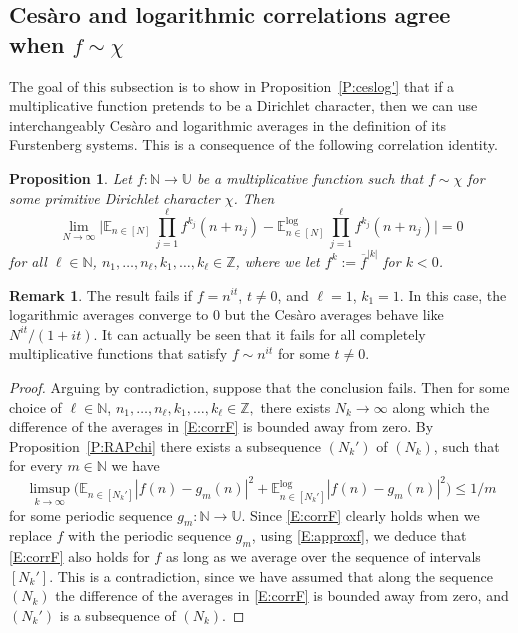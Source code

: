 \documentclass[11pt]{amsart}
\newtheorem{proposition}[lemma]{Proposition}
\theoremstyle{definition}
\newtheorem*{remark}{Remark}
\newcommand{\lE}{\mathbb{E}^{\log}}
\newcommand{\E}{{\mathbb E}}
\newcommand{\N}{{\mathbb N}}
\newcommand{\Z}{{\mathbb Z}}
\newcommand{\U}{{\mathbb U}}
\begin{document}
	\subsection{Ces\`aro and logarithmic correlations agree when $f\sim \chi$}\label{SS:Ces=log}
The goal of this subsection is to show in Proposition~\ref{P:ceslog'} that  if a  multiplicative function  pretends to be a Dirichlet character, then we can use interchangeably Ces\`aro and logarithmic averages in the definition of its Furstenberg systems. This is a consequence of the following correlation identity.
\begin{proposition}\label{P:ceslog}
	Let $f\colon \N\to \U$ be a multiplicative function such that  $f\sim \chi$ for some primitive Dirichlet character $\chi$. Then
	\begin{equation}\label{E:corrF}
		\lim_{N\to\infty}\Big| \E_{n\in [N]}\, \prod_{j=1}^\ell f^{k_j}(n+n_j)-\lE_{n\in [N]}\, \prod_{j=1}^\ell f^{k_j}(n+n_j)\Big|=0
	\end{equation}
	for all $\ell\in \N$, $n_1,\ldots, n_\ell, k_1,\ldots, k_\ell\in \Z$, where we let  $f^k:=\overline{f}^{|k|}$ for $k<0$.
\end{proposition}
\begin{remark}
	The result fails if $f=n^{it}$, $t\neq 0$,  and $\ell=1$, $k_1=1$.  In this case, the logarithmic averages converge to $0$
	but the Ces\`aro averages behave like $N^{it}/(1+it)$.  It can actually be seen that it fails for all completely multiplicative functions that satisfy $f\sim n^{it}$ for some $t\neq 0$.
\end{remark}
\begin{proof}
	Arguing by contradiction, suppose that the conclusion fails. Then for some choice of
	$\ell\in \N$, $n_1,\ldots, n_\ell, k_1,\ldots, k_\ell\in \Z,$ there exists $N_k\to\infty$ along which the difference of the  averages in \eqref{E:corrF} is bounded away from zero. By  Proposition~\ref{P:RAPchi} there exists a subsequence $(N_k')$ of $(N_k)$,  such that for every $m\in\N$ we have
	\begin{equation}\label{E:approxf}
		\limsup_{k\to\infty} \big(\E_{n\in [N_k']}|f(n)- g_m(n)|^2  +\lE_{n\in [N_k']}|f(n)- g_m(n)|^2\big)\leq 1/m
	\end{equation}
	for some periodic sequence $g_m\colon \N\to \U$.  Since  \eqref{E:corrF} clearly holds
	when we replace $f$ with the periodic sequence $g_m$, using \eqref{E:approxf}, we deduce that \eqref{E:corrF}
	also holds for $f$ as long as we average over the sequence of intervals $[N_k']$. This is a contradiction, since we have assumed that along  the sequence $(N_k)$  the difference of the averages in \eqref{E:corrF}
	is bounded away from zero, and $(N_k')$ is a subsequence of $(N_k)$.
\end{proof}
\end{document}
